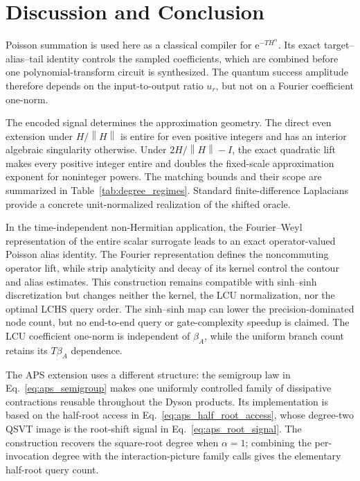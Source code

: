 \documentclass[aps,pra,reprint,floatfix,unsortedaddress,superscriptaddress]{revtex4-2}
\newcommand{\norm}[1]{\left\lVert#1\right\rVert}
\begin{document}
\section{Discussion and Conclusion}
\label{sec:conclusion}

Poisson summation is used here as a classical compiler for
$\mathrm e^{-T H^\alpha}$.  Its exact target--alias--tail identity
controls the sampled coefficients, which are combined before one
polynomial-transform circuit is synthesized.  The quantum success
amplitude therefore depends on the input-to-output ratio $u_r$, but not
on a Fourier coefficient one-norm.

The encoded signal determines the approximation geometry.  The direct
even extension under $H/\norm{H}$ is entire for even positive integers
and has an interior algebraic singularity otherwise.  Under
$2H/\norm{H}-I$, the exact quadratic lift makes every positive integer
entire and doubles the fixed-scale approximation exponent for
noninteger powers.  The matching bounds and their scope are summarized
in Table~\ref{tab:degree_regimes}.  Standard finite-difference
Laplacians provide a concrete unit-normalized realization of the
shifted oracle.

In the time-independent non-Hermitian application, the Fourier--Weyl
representation of the entire scalar surrogate leads to an exact
operator-valued Poisson alias identity.  The Fourier representation
defines the noncommuting operator lift, while strip analyticity and
decay of its kernel control the contour and alias estimates.  This
construction remains compatible with
sinh--sinh discretization but changes neither the kernel, the LCU
normalization, nor the optimal LCHS query order.  The sinh--sinh map can
lower the precision-dominated node count, but no end-to-end query or
gate-complexity speedup is claimed.  The LCU coefficient one-norm is
independent of $\beta_A$, while the uniform branch count retains its
$T\beta_A$ dependence.

The APS extension uses a different structure: the semigroup law in
Eq.~\eqref{eq:aps_semigroup} makes one uniformly controlled family of
dissipative contractions reusable throughout the Dyson products.  Its
implementation is based on the half-root access in
Eq.~\eqref{eq:aps_half_root_access}, whose degree-two QSVT image is the
root-shift signal in Eq.~\eqref{eq:aps_root_signal}.  The construction
recovers the square-root degree when $\alpha=1$; combining the
per-invocation degree with the interaction-picture family calls gives
the elementary half-root query count.
\end{document}

